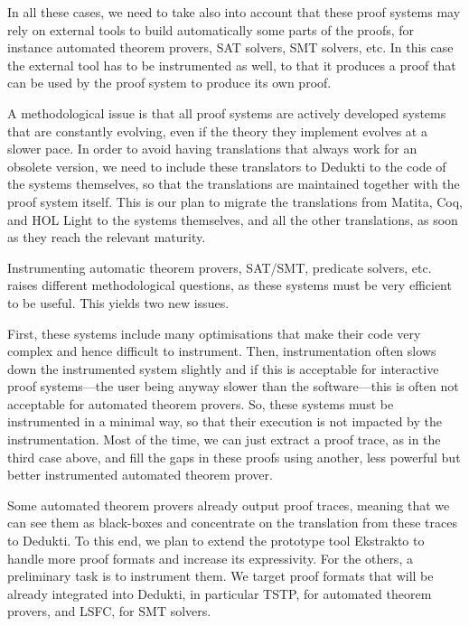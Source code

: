 In all these cases, we need to take also into account that these proof
systems may rely on external tools to build automatically some parts
of the proofs, for instance automated theorem provers, SAT solvers,
SMT solvers, etc. In this case the external tool has to be
instrumented as well, to that it produces a proof that can be used by
the proof system to produce its own proof.

A methodological issue is that all proof systems are actively
developed systems that are constantly evolving, even if the theory
they implement evolves at a slower pace. In order to avoid having
translations that always work for an obsolete version, we need to
include these translators to Dedukti to the code of the systems
themselves, so that the translations are maintained together with
the proof system itself. This is our plan to migrate the
translations from Matita, Coq, and HOL Light to the systems
themselves, and all the other translations, as soon as they reach the
relevant maturity.


Instrumenting automatic theorem provers, SAT/SMT, predicate solvers,
etc.
raises different methodological questions, as these systems
must be very efficient to be useful. This yields two new issues.

First, these systems include many optimisations that make their code
very complex and hence difficult to instrument. Then, instrumentation
often slows down the instrumented system slightly and if this is
acceptable for interactive proof systems---the user being anyway
slower than the software---this is often not acceptable for automated
theorem provers.
So, these systems must be instrumented in a minimal way, so that their
execution is not impacted by the instrumentation.  Most of the
time, we can just extract a proof trace, as in the third case above,
and fill the gaps in these proofs using another, less powerful but better
instrumented automated theorem prover.

Some automated theorem provers already output proof traces, meaning
that we can see them as black-boxes and concentrate on the translation
from these traces to Dedukti. To this end, we plan to extend the
prototype tool Ekstrakto to handle more proof formats and increase its
expressivity.
For the others, a preliminary task is to instrument them.  We target
proof formats that will be already integrated into Dedukti, in
particular TSTP, for automated theorem provers, and LSFC, for SMT solvers.

